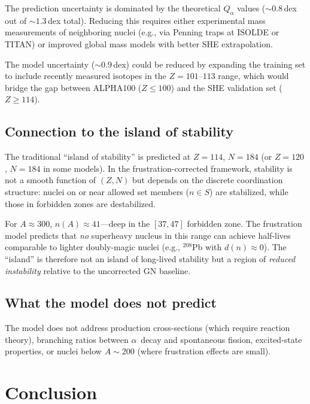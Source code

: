 \documentclass[aps,prc,twocolumn,showpacs,preprintnumbers,amsmath,amssymb]{revtex4-2}
\newcommand{\Qalpha}{Q_\alpha}
\newcommand{\dn}{d(n)}
\begin{document}
The prediction uncertainty is dominated by the
theoretical $\Qalpha$ values ($\sim 0.8$\,dex out of
$\sim 1.3$\,dex total).  Reducing this requires either
experimental mass measurements of neighboring nuclei
(e.g., via Penning traps at ISOLDE or TITAN) or
improved global mass models with better SHE
extrapolation.

The model uncertainty ($\sim 0.9$\,dex) could be reduced by
expanding the training set to include recently measured
isotopes in the $Z = 101$--$113$ range, which would
bridge the gap between ALPHA100 ($Z \leq 100$) and the
SHE validation set ($Z \geq 114$).

\subsection{Connection to the island of stability}

The traditional ``island of stability'' is predicted at
$Z = 114$, $N = 184$ (or $Z = 120$, $N = 184$ in some
models).  In the frustration-corrected framework, stability
is not a smooth function of $(Z, N)$ but depends on the
discrete coordination structure: nuclei on or near allowed
set members ($n \in S$) are stabilized, while those in
forbidden zones are destabilized.

For $A \approx 300$, $n(A) \approx 41$---deep in the
$[37, 47]$ forbidden zone.  The frustration model predicts
that \emph{no} superheavy nucleus in this range can achieve
half-lives comparable to lighter doubly-magic nuclei
(e.g., ${}^{208}$Pb with $\dn \approx 0$).
The ``island'' is therefore not an island of long-lived
stability but a region of \emph{reduced instability}
relative to the uncorrected GN baseline.

\subsection{What the model does not predict}

The model does not address production cross-sections
(which require reaction theory), branching ratios between
$\alpha$~decay and spontaneous fission, excited-state
properties, or nuclei below $A \sim 200$ (where frustration
effects are small).

\section{Conclusion}
\label{sec:conclusion}
\end{document}
